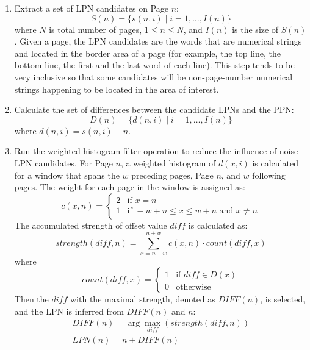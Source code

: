 \documentclass[10pt]{article}
\begin{document}
\begin{enumerate}
\item Extract a set of LPN candidates on Page \(n\):
\[
S(n) = \{s(n,i)\mid i = 1,\ldots,I(n)\} \tag{1}
\]
where \(N\) is total number of pages, \(1\leq n\leq N\), and \(I(n)\) is the size of \(S(n)\). Given a page, the LPN candidates are the words that are numerical strings and located in the border area of a page (for example, the top line, the bottom line, the first and the last word of each line). This step tends to be very inclusive so that some candidates will be non-page-number numerical strings happening to be located in the area of interest.

\item Calculate the set of differences between the candidate LPNs and the PPN:
\[
D(n) = \{d(n,i)\mid i = 1,\ldots,I(n)\} \tag{2}
\]
where \(d(n,i) = s(n,i) - n\).

\item Run the weighted histogram filter operation to reduce the influence of noise LPN candidates. For Page \(n\), a weighted histogram of \(d(x,i)\) is calculated for a window that spans the \(w\) preceding pages, Page \(n\), and \(w\) following pages. The weight for each page in the window is assigned as:
\[
c(x,n) = \left\{ \begin{array}{ll}
2 & \text{if } x = n\\
1 & \text{if } -w + n \leq x \leq w + n \text{ and } x \neq n
\end{array} \right. \tag{3}
\]
The accumulated strength of offset value \(diff\) is calculated as:
\[
strength(diff,n) = \sum_{x=n-w}^{n+w} c(x,n) \cdot count(diff,x) \tag{4}
\]
where 
\[
count(diff,x) = \left\{ \begin{array}{ll}
1 & \text{if } diff \in D(x)\\
0 & \text{otherwise}
\end{array} \right.
\]
Then the \(diff\) with the maximal strength, denoted as \(DIFF(n)\), is selected, and the LPN is inferred from \(DIFF(n)\) and \(n\):
\[
\begin{array}{l}
DIFF(n) = \arg\max_{diff}(strength(diff,n))\\
LPN(n) = n + DIFF(n)
\end{array} \tag{5}
\]
\end{enumerate}
\end{document}
